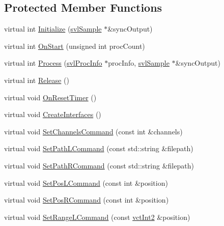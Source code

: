 \subsection*{Protected Member Functions}
\begin{DoxyCompactItemize}
\item 
virtual int \hyperlink{classsvl_filter_source_video_file_a1c466c0c0c33d3da0be9a8b010646071}{Initialize} (\hyperlink{classsvl_sample}{svl\-Sample} $\ast$\&sync\-Output)
\item 
virtual int \hyperlink{classsvl_filter_source_video_file_a98a8bd834633d469d5d6348207754ef1}{On\-Start} (unsigned int proc\-Count)
\item 
virtual int \hyperlink{classsvl_filter_source_video_file_a3021fa3689ff9f2e24b3e0b5b79603bb}{Process} (\hyperlink{structsvl_proc_info}{svl\-Proc\-Info} $\ast$proc\-Info, \hyperlink{classsvl_sample}{svl\-Sample} $\ast$\&sync\-Output)
\item 
virtual int \hyperlink{classsvl_filter_source_video_file_ac381ae4ab3182efc839f09643073dfbd}{Release} ()
\item 
virtual void \hyperlink{classsvl_filter_source_video_file_af3ccc486928886bf53c73998f92e9f3d}{On\-Reset\-Timer} ()
\item 
virtual void \hyperlink{classsvl_filter_source_video_file_a8ffbc78ebf75dc6884006a882e0d9435}{Create\-Interfaces} ()
\item 
virtual void \hyperlink{classsvl_filter_source_video_file_acbaf9def1d52fe176fb653ed7b6dcd0a}{Set\-Channels\-Command} (const int \&channels)
\item 
virtual void \hyperlink{classsvl_filter_source_video_file_a50e0354818f074377550012423d0469b}{Set\-Path\-L\-Command} (const std\-::string \&filepath)
\item 
virtual void \hyperlink{classsvl_filter_source_video_file_a04b7c8fe4be551aa5251ec8b3d89b770}{Set\-Path\-R\-Command} (const std\-::string \&filepath)
\item 
virtual void \hyperlink{classsvl_filter_source_video_file_af286cefc39044c34ba7fa8e4d7d715d5}{Set\-Pos\-L\-Command} (const int \&position)
\item 
virtual void \hyperlink{classsvl_filter_source_video_file_a3da09c90192a5b7b2accfd9725b3d4b9}{Set\-Pos\-R\-Command} (const int \&position)
\item 
virtual void \hyperlink{classsvl_filter_source_video_file_a397f5b16433461639fa77059cb4b2bd7}{Set\-Range\-L\-Command} (const \hyperlink{vct_fixed_size_vector_types_8h_add8c88eb6a432b15f14b866b9c35325f}{vct\-Int2} \&position)

\end{DoxyCompactItemize}
